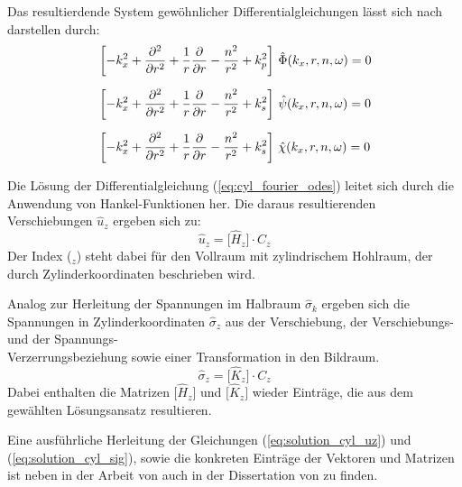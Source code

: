Das resultierdende System gewöhnlicher Differentialgleichungen lässt sich nach \cite{Fruehe2010} darstellen durch:
\begin{subequations}\label{eq:cyl_fourier_odes}
	{%
		\begin{align}
			&\left[-k_x^{2}
			+ \frac{\partial^{2}}{\partial r^{2}}
			+ \frac{1}{r}\frac{\partial}{\partial r}
			- \frac{n^{2}}{r^{2}}
			+ k_p^{2}\right]\,
			\hat{\Phi}\!\left(k_x,r,n,\omega\right) = 0 \label{eq:13a}\\[6pt]
			&\left[-k_x^{2}
			+ \frac{\partial^{2}}{\partial r^{2}}
			+ \frac{1}{r}\frac{\partial}{\partial r}
			- \frac{n^{2}}{r^{2}}
			+ k_s^{2}\right]\,
			\hat{\psi}\!\left(k_x,r,n,\omega\right) = 0 \label{eq:13b}\\[6pt]
			&\left[-k_x^{2}
			+ \frac{\partial^{2}}{\partial r^{2}}
			+ \frac{1}{r}\frac{\partial}{\partial r}
			- \frac{n^{2}}{r^{2}}
			+ k_s^{2}\right]\,
			\hat{\chi}\!\left(k_x,r,n,\omega\right) = 0 \label{eq:13c}
		\end{align}
	}%
\end{subequations}

Die Lösung der Differentialgleichung (\ref{eq:cyl_fourier_odes}) leitet sich durch die Anwendung von Hankel-Funktionen her. Die daraus resultierenden Verschiebungen \(\hat{u}_{z}\) ergeben sich zu:
\begin{equation}\label{eq:solution_cyl_uz}
	\hat{u}_{z} = \bigl[\hat{H}_{z}\bigr]\cdot C_{z}
\end{equation}
Der Index (\({}_z\)) steht dabei für den Vollraum mit zylindrischem Hohlraum, der durch Zylinderkoordinaten beschrieben wird.

Analog zur Herleitung der Spannungen im Halbraum \(\hat{\sigma}_{k}\) ergeben sich die Spannungen in Zylinderkoordinaten \(\hat{\sigma}_{z}\) aus der Verschiebung, der Verschiebungs- und der Spannungs-\\Verzerrungsbeziehung sowie einer Transformation in den Bildraum.
\begin{equation}\label{eq:solution_cyl_sig}
	\hat{\sigma}_{z} = \bigl[\hat{K}_{z}\bigr]\cdot C_{z}
\end{equation}
Dabei enthalten die Matrizen $\bigl[\hat{H}_{z}\bigr]$ und $\bigl[\hat{K}_{z}\bigr]$ wieder Einträge, die aus dem gewählten Lösungsansatz resultieren.

Eine ausführliche Herleitung der Gleichungen (\ref{eq:solution_cyl_uz}) und (\ref{eq:solution_cyl_sig}), sowie die konkreten Einträge der Vektoren und Matrizen ist neben in der Arbeit von \cite{Fruehe2010} auch in der Dissertation von \cite{Mueller2007} zu finden.

